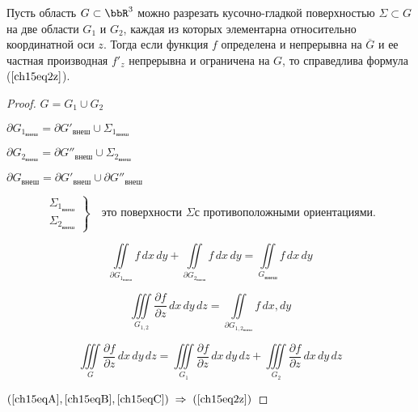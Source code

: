 \begin{lemm}
Пусть область $G \subset \bbR^3$ можно разрезать кусочно-гладкой поверхностью $\Sigma \subset G$ на две области $G_1$ и $G_2$, каждая из которых элементарна относительно координатной оси $z$. Тогда если функция $f$ определена и непрерывна на $\overline{G}$ и ее частная производная $f'_z$ непрерывна и ограничена на $G$, то справедлива формула ($\ref{ch15eq2z}$).
\end{lemm}

\begin{proof}
$G = G_1 \cup G_2$

$\partial G_{1_{\textit{внеш}}} = \partial G'_{\textit{внеш}} \cup \Sigma_{1_{\textit{внеш}}}$

$\partial G_{2_{\textit{внеш}}} = \partial G''_{\textit{внеш}} \cup \Sigma_{2_{\textit{внеш}}}$

$\partial G_{\textit{внеш}} = \partial G'_{\textit{внеш}} \cup \partial G''_{\textit{внеш}}$

\begin{equation*}
\left.\begin{aligned}
\Sigma_{1_{\textit{внеш}}} \\ 
 \Sigma_{2_{\textit{внеш}}}
\end{aligned} \right\} \quad  \textit{это поверхности } \Sigma \textit{с противоположными ориентациями}.
\end{equation*}

\begin{equation} \label{ch15eqA}
\iint\limits_{\partial G_{1_{\textit{внеш}}}} f \,dx\,dy + \iint\limits_{\partial G_{2_{\textit{внеш}}}} f \,dx\,dy = \iint\limits_{G_{\textit{внеш}}} f\,dx\,dy
\end{equation}

\begin{equation} \label{ch15eqB}
\iiint\limits_{G_{1,2}} \frac{\partial f}{\partial z}\,dx\,dy\,dz = \iint\limits_{\partial G_{1,2_{\textit{внеш}}}} f \,dx,dy
\end{equation}

\begin{equation} \label{ch15eqC}
\iiint\limits_{G} \frac{\partial f}{\partial z}\,dx\,dy\,dz = \iiint\limits_{G_1} \frac{\partial f}{\partial z}\,dx\,dy\,dz + \iiint\limits_{G_2} \frac{\partial f}{\partial z}\,dx\,dy\,dz 
\end{equation}

$(\ref{ch15eqA}, \ref{ch15eqB}, \ref{ch15eqC}) \; \Rightarrow \; (\ref{ch15eq2z})$
\end{proof}

